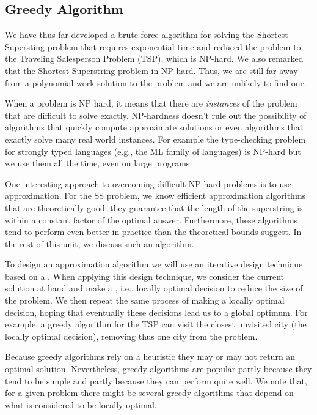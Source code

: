 \subsection{Greedy Algorithm}
\label{genome::alg::greedy}

\begin{gram}
We have thus far developed a brute-force algorithm for solving the
Shortest Supersting problem that requires exponential time and reduced
the problem to the Traveling Salesperson Problem (TSP), which is
NP-hard.
%
We also remarked that the Shortest Superstring problem in NP-hard.
%
Thus, we are still far away from a polynomial-work solution to the
problem and we are unlikely to find one.
%

When a problem is NP hard, it means that there are {\em instances} of
the problem that are difficult to solve exactly.  
%
NP-hardness doesn't rule out the possibility of algorithms that
quickly compute approximate solutions or even algorithms
that exactly solve many real world instances.
%
For example the type-checking problem for strongly typed languages
(e.g., the ML family of languages) is NP-hard but we use them all the
time, even on large programs.
\end{gram}

\begin{gram}
One interesting approach to overcoming difficult NP-hard problems is
to use approximation.
%
For the SS problem, we know efficient approximation
algorithms that are theoretically good: they guarantee that the length
of the superstring is within a constant factor of the optimal answer.
%
Furthermore, these algorithms tend to perform even better in practice
than the theoretical bounds suggest.
%
In the rest of this unit, we discuss such an algorithm.
\end{gram}

\begin{gram}
To design an approximation algorithm we will use an iterative design
technique based on a .
%
When applying this design technique, we consider the current solution
at hand and make a , i.e., locally optimal decision to
reduce the size of the problem.
%
We then repeat the same process of making a locally optimal decision,
hoping that eventually these decisions lead us to a global optimum.
%
For example, a greedy algorithm for the TSP can visit the closest
unvisited city (the locally optimal decision), removing thus one city
from the problem.
%

Because greedy algorithms rely on a heuristic they may or may not
return an optimal solution.
%
%
Nevertheless, greedy algorithms are popular partly because they tend
to be simple and partly because they can perform quite well.
%
We note that, for a given problem there might be several greedy
algorithms that depend on what is considered to be locally optimal.
%
\end{gram}


